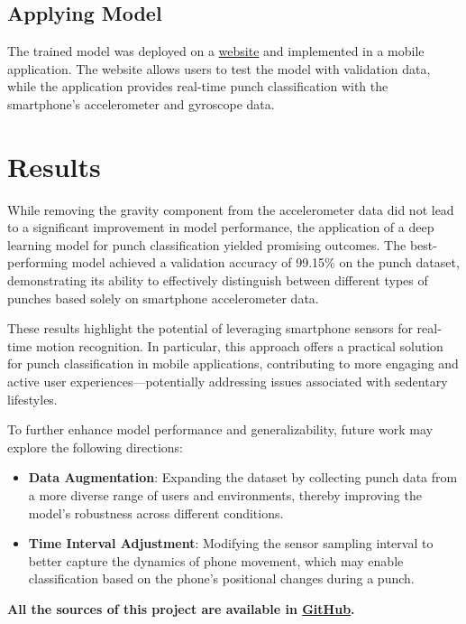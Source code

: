 \documentclass{article}
\begin{document}
    \FloatBarrier
    \subsection{Applying Model}
    The trained model was deployed on a
    \href{https://punch-boxing.github.io/punch-ml-test-web/}{website} and
    implemented in a mobile application. The website allows users to test the model
    with validation data, while the application provides real-time punch
    classification with the smartphone's accelerometer and gyroscope data. \FloatBarrier

    \section{Results}

    While removing the gravity component from the accelerometer data did not lead
    to a significant improvement in model performance, the application of a deep
    learning model for punch classification yielded promising outcomes. The best-performing
    model achieved a validation accuracy of 99.15\% on the punch dataset, demonstrating
    its ability to effectively distinguish between different types of punches based
    solely on smartphone accelerometer data.

    These results highlight the potential of leveraging smartphone sensors for real-time
    motion recognition. In particular, this approach offers a practical solution
    for punch classification in mobile applications, contributing to more
    engaging and active user experiences—potentially addressing issues
    associated with sedentary lifestyles.

    To further enhance model performance and generalizability, future work may explore
    the following directions:
    \begin{itemize}
        \item \textbf{Data Augmentation}: Expanding the dataset by collecting punch
            data from a more diverse range of users and environments, thereby
            improving the model's robustness across different conditions.

        \item \textbf{Time Interval Adjustment}: Modifying the sensor sampling interval
            to better capture the dynamics of phone movement, which may enable
            classification based on the phone’s positional changes during a
            punch.
    \end{itemize}

    \textbf{All the sources of this project are available in
    \href{https://github.com/punch-boxing/}{GitHub}.}
\end{document}
